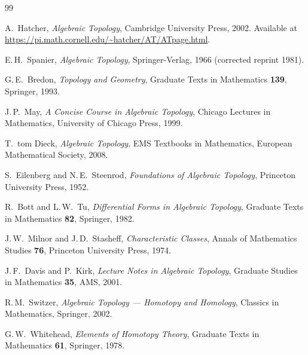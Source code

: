 \documentclass[12pt,a4paper,openany]{book}
\theoremstyle{definition}
\theoremstyle{plain}
\theoremstyle{remark}
\begin{document}
\begin{thebibliography}{99}

A.~Hatcher,
\textit{Algebraic Topology},
Cambridge University Press, 2002.
Available at \url{https://pi.math.cornell.edu/~hatcher/AT/ATpage.html}.

E.\,H.~Spanier,
\textit{Algebraic Topology},
Springer-Verlag, 1966 (corrected reprint 1981).

G.\,E.~Bredon,
\textit{Topology and Geometry},
Graduate Texts in Mathematics \textbf{139}, Springer, 1993.

J.\,P.~May,
\textit{A Concise Course in Algebraic Topology},
Chicago Lectures in Mathematics, University of Chicago Press, 1999.

T.~tom Dieck,
\textit{Algebraic Topology},
EMS Textbooks in Mathematics, European Mathematical Society, 2008.

S.~Eilenberg and N.\,E.~Steenrod,
\textit{Foundations of Algebraic Topology},
Princeton University Press, 1952.

R.~Bott and L.\,W.~Tu,
\textit{Differential Forms in Algebraic Topology},
Graduate Texts in Mathematics \textbf{82}, Springer, 1982.

J.\,W.~Milnor and J.\,D.~Stasheff,
\textit{Characteristic Classes},
Annals of Mathematics Studies \textbf{76}, Princeton University Press,
1974.

J.\,F.~Davis and P.~Kirk,
\textit{Lecture Notes in Algebraic Topology},
Graduate Studies in Mathematics \textbf{35}, AMS, 2001.

R.\,M.~Switzer,
\textit{Algebraic Topology --- Homotopy and Homology},
Classics in Mathematics, Springer, 2002.

G.\,W.~Whitehead,
\textit{Elements of Homotopy Theory},
Graduate Texts in Mathematics \textbf{61}, Springer, 1978.

\end{thebibliography}

\printindex
\end{document}
